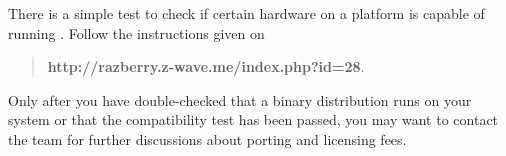 There is a simple test to check if certain hardware on a platform is capable of running \zway.
Follow the instructions given on

\begin{quote}
\textbf{http://razberry.z-wave.me/index.php?id=28}.
\end{quote}

Only after you have double-checked that a binary distribution runs on your system or that 
the compatibility test has been passed, you may want to contact the \zwaveme team for 
further discussions about porting and licensing fees.
